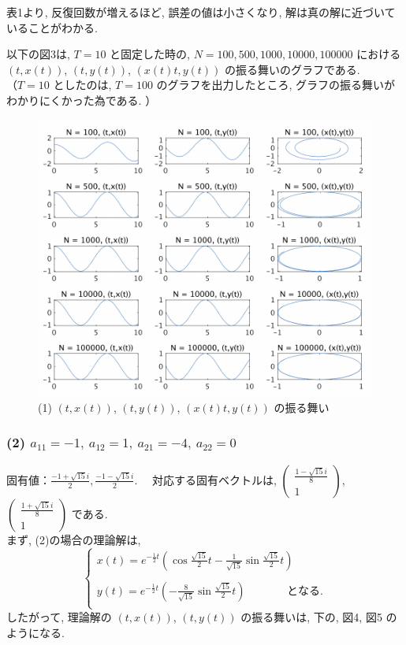 \documentclass[11pt]{jsarticle}
\begin{document}
表1より, 反復回数が増えるほど, 誤差の値は小さくなり, 解は真の解に近づいていることがわかる. \par
以下の図3は, $T = 10$ と固定した時の, $N = 100, 500, 1000, 10000, 100000$ における $(t, x(t))$, $(t, y(t))$, $(x(t)t, y(t))$ の振る舞いのグラフである. \\
（$T = 10$ としたのは, $T = 100$ のグラフを出力したところ, グラフの振る舞いがわかりにくかった為である. ）
\begin{figure}[htbp]
\centering
\includegraphics[width=15cm]{images/1_matlab.png}
\caption{(1) $(t, x(t))$, $(t, y(t))$, $(x(t)t, y(t))$ の振る舞い}
\end{figure}

\clearpage
\subsubsection{(2) $a_{11} = -1, \ a_{12} = 1, \ a_{21} = -4, \ a_{22} = 0$}
固有値：$\displaystyle \frac{-1+\sqrt{15}i}{2}, \frac{-1-\sqrt{15}i}{2}$. \ \ 対応する固有ベクトルは, $\begin{pmatrix} \frac{1-\sqrt{15}i}{8} \\ 1 \end{pmatrix}$, $\begin{pmatrix} \frac{1+\sqrt{15}i}{8} \\ 1 \end{pmatrix}$ である. \\
まず, (2)の場合の理論解は, 
\[\left\{ 
\begin{array}{l}
\displaystyle x(t) = e^{-\frac{1}{2}t}\left( \cos{\frac{\sqrt{15}}{2}t} - \frac{1}{\sqrt{15}}\sin{\frac{\sqrt{15}}{2}t}\right) \\ \\
\displaystyle y(t) = e^{-\frac{1}{2}t}\left(-\frac{8}{\sqrt{15}}\sin{\frac{\sqrt{15}}{2}t}\right) \ \ \ \ \ \ \ \ \ \ \ \ \ \ \ \ \ となる. \\
\end{array}
\right. \]
したがって, 理論解の $(t, x(t))$, $(t, y(t))$ の振る舞いは, 下の, 図4, 図5 のようになる. 
\end{document}
